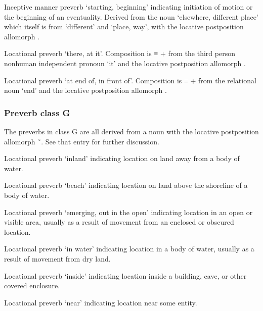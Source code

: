 \begin{morphdesc}
\item[\X{g̱unayéi=}]
\item[\X{g̱unéi=}] \removeitemvspace
\item[\X{g̱unyéi=}] \removeitemvspace
	Inceptive manner preverb ‘starting, beginning’ indicating initiation of motion
	or the beginning of an eventuality.
	Derived from the noun  ‘elsewhere, different place’
		which itself is from  ‘different’ and  ‘place, way’,
		with the locative postposition allomorph .

\item[\X{áa=}]
	Locational preverb ‘there, at it’.
	Composition is  ≡  + 
		from the third person nonhuman independent pronoun  ‘it’
		and the locative postposition allomorph .

\item[\X{shóo=}]
	Locational preverb ‘at end of, in front of’.
	Composition is  ≡  + 
		from the relational noun  ‘end’
		and the locative postposition allomorph .
\end{morphdesc}

\subsubsection{Preverb class G}\label{sec:inventory-preverb-G}

The preverbs in class G are all derived from a noun
	with the locative postposition allomorph  \~\ .
See that entry for further discussion.

\begin{morphdesc}
\item[\X{dáag̱i=}]
	Locational preverb ‘inland’ indicating location on land away from a body of water.

\item[\X{éeg̱i=}]
\item[\X{éig̱i=}] \removeitemvspace
	Locational preverb ‘beach’ indicating location on land above the shoreline of a body of water.

\item[\X{gági=}]
	Locational preverb ‘emerging, out in the open’ indicating location in an open or visible area,
		usually as a result of movement from an enclosed or obscured location.

\item[\X{héeni=}]
	Locational preverb ‘in water’ indicating location in a body of water,
		usually as a result of movement from dry land.

\item[\X{neilí=}]
	Locational preverb ‘inside’ indicating location inside a building, cave,
		or other covered enclosure.

\item[\X{x̱áni=}]
	Locational preverb ‘near’ indicating location near some entity.
\end{morphdesc}

